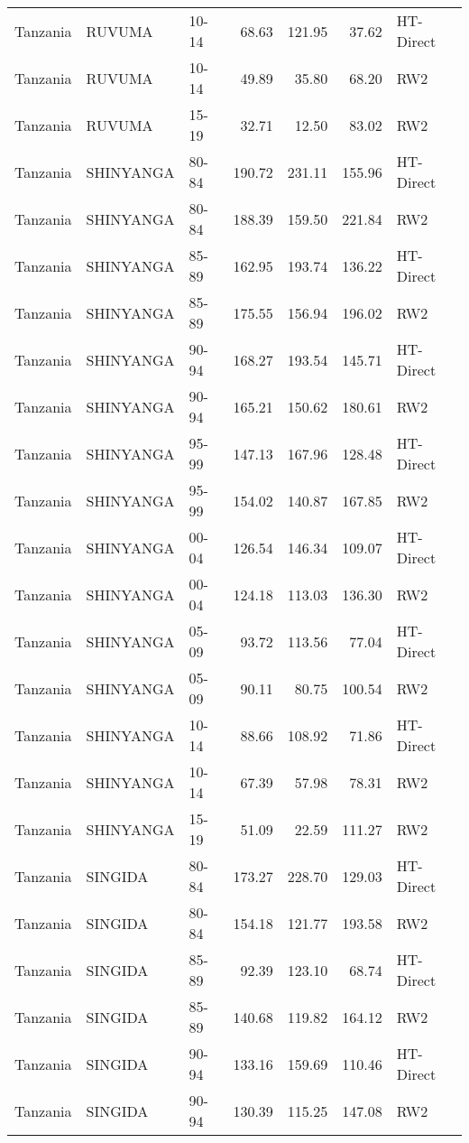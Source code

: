 \begin{longtable}{lllrrrl}
  Tanzania & RUVUMA & 10-14 & 68.63 & 121.95 & 37.62 & HT-Direct \\ 
  Tanzania & RUVUMA & 10-14 & 49.89 & 35.80 & 68.20 & RW2 \\ 
  Tanzania & RUVUMA & 15-19 & 32.71 & 12.50 & 83.02 & RW2 \\ 
  Tanzania & SHINYANGA & 80-84 & 190.72 & 231.11 & 155.96 & HT-Direct \\ 
  Tanzania & SHINYANGA & 80-84 & 188.39 & 159.50 & 221.84 & RW2 \\ 
  Tanzania & SHINYANGA & 85-89 & 162.95 & 193.74 & 136.22 & HT-Direct \\ 
  Tanzania & SHINYANGA & 85-89 & 175.55 & 156.94 & 196.02 & RW2 \\ 
  Tanzania & SHINYANGA & 90-94 & 168.27 & 193.54 & 145.71 & HT-Direct \\ 
  Tanzania & SHINYANGA & 90-94 & 165.21 & 150.62 & 180.61 & RW2 \\ 
  Tanzania & SHINYANGA & 95-99 & 147.13 & 167.96 & 128.48 & HT-Direct \\ 
  Tanzania & SHINYANGA & 95-99 & 154.02 & 140.87 & 167.85 & RW2 \\ 
  Tanzania & SHINYANGA & 00-04 & 126.54 & 146.34 & 109.07 & HT-Direct \\ 
  Tanzania & SHINYANGA & 00-04 & 124.18 & 113.03 & 136.30 & RW2 \\ 
  Tanzania & SHINYANGA & 05-09 & 93.72 & 113.56 & 77.04 & HT-Direct \\ 
  Tanzania & SHINYANGA & 05-09 & 90.11 & 80.75 & 100.54 & RW2 \\ 
  Tanzania & SHINYANGA & 10-14 & 88.66 & 108.92 & 71.86 & HT-Direct \\ 
  Tanzania & SHINYANGA & 10-14 & 67.39 & 57.98 & 78.31 & RW2 \\ 
  Tanzania & SHINYANGA & 15-19 & 51.09 & 22.59 & 111.27 & RW2 \\ 
  Tanzania & SINGIDA & 80-84 & 173.27 & 228.70 & 129.03 & HT-Direct \\ 
  Tanzania & SINGIDA & 80-84 & 154.18 & 121.77 & 193.58 & RW2 \\ 
  Tanzania & SINGIDA & 85-89 & 92.39 & 123.10 & 68.74 & HT-Direct \\ 
  Tanzania & SINGIDA & 85-89 & 140.68 & 119.82 & 164.12 & RW2 \\ 
  Tanzania & SINGIDA & 90-94 & 133.16 & 159.69 & 110.46 & HT-Direct \\ 
  Tanzania & SINGIDA & 90-94 & 130.39 & 115.25 & 147.08 & RW2 \\ 

\end{longtable}
